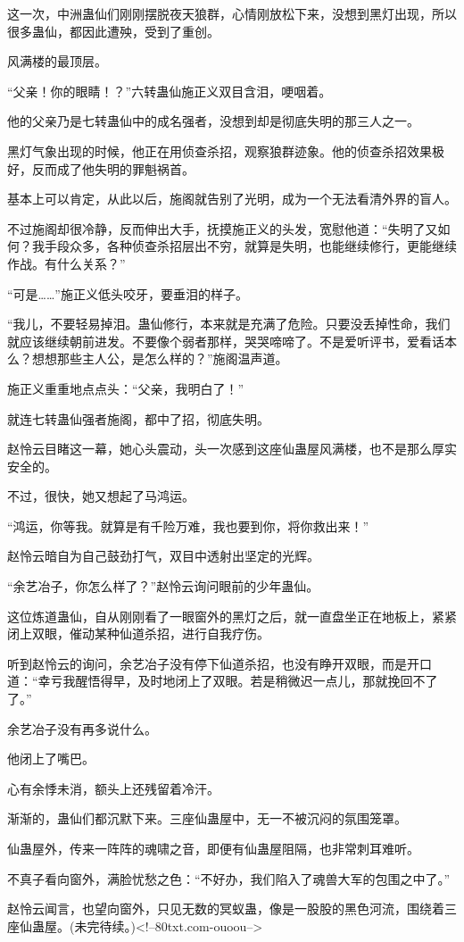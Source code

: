 \begin{this_body}
这一次，中洲蛊仙们刚刚摆脱夜天狼群，心情刚放松下来，没想到黑灯出现，所以很多蛊仙，都因此遭殃，受到了重创。

风满楼的最顶层。

“父亲！你的眼睛！？”六转蛊仙施正义双目含泪，哽咽着。

他的父亲乃是七转蛊仙中的成名强者，没想到却是彻底失明的那三人之一。

黑灯气象出现的时候，他正在用侦查杀招，观察狼群迹象。他的侦查杀招效果极好，反而成了他失明的罪魁祸首。

基本上可以肯定，从此以后，施阁就告别了光明，成为一个无法看清外界的盲人。

不过施阁却很冷静，反而伸出大手，抚摸施正义的头发，宽慰他道：“失明了又如何？我手段众多，各种侦查杀招层出不穷，就算是失明，也能继续修行，更能继续作战。有什么关系？”

“可是……”施正义低头咬牙，要垂泪的样子。

“我儿，不要轻易掉泪。蛊仙修行，本来就是充满了危险。只要没丢掉性命，我们就应该继续朝前进发。不要像个弱者那样，哭哭啼啼了。不是爱听评书，爱看话本么？想想那些主人公，是怎么样的？”施阁温声道。

施正义重重地点点头：“父亲，我明白了！”

就连七转蛊仙强者施阁，都中了招，彻底失明。

赵怜云目睹这一幕，她心头震动，头一次感到这座仙蛊屋风满楼，也不是那么厚实安全的。

不过，很快，她又想起了马鸿运。

“鸿运，你等我。就算是有千险万难，我也要到你，将你救出来！”

赵怜云暗自为自己鼓劲打气，双目中透射出坚定的光辉。

“余艺冶子，你怎么样了？”赵怜云询问眼前的少年蛊仙。

这位炼道蛊仙，自从刚刚看了一眼窗外的黑灯之后，就一直盘坐正在地板上，紧紧闭上双眼，催动某种仙道杀招，进行自我疗伤。

听到赵怜云的询问，余艺冶子没有停下仙道杀招，也没有睁开双眼，而是开口道：“幸亏我醒悟得早，及时地闭上了双眼。若是稍微迟一点儿，那就挽回不了了。”

余艺冶子没有再多说什么。

他闭上了嘴巴。

心有余悸未消，额头上还残留着冷汗。

渐渐的，蛊仙们都沉默下来。三座仙蛊屋中，无一不被沉闷的氛围笼罩。

仙蛊屋外，传来一阵阵的魂啸之音，即便有仙蛊屋阻隔，也非常刺耳难听。

不真子看向窗外，满脸忧愁之色：“不好办，我们陷入了魂兽大军的包围之中了。”

赵怜云闻言，也望向窗外，只见无数的冥蚁蛊，像是一股股的黑色河流，围绕着三座仙蛊屋。(未完待续。)<!--80txt.com-ouoou-->

\end{this_body}

